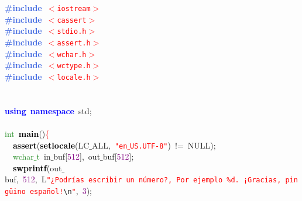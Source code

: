 
{\ttfamily \raggedright {
\noindent
\mbox{}\textbf{\textcolor{RoyalBlue}{\#include}}\ \texttt{\textcolor{Red}{$<$iostream$>$}} \\
\mbox{}\textbf{\textcolor{RoyalBlue}{\#include}}\ \texttt{\textcolor{Red}{$<$cassert$>$}} \\
\mbox{}\textbf{\textcolor{RoyalBlue}{\#include}}\ \texttt{\textcolor{Red}{$<$stdio.h$>$}} \\
\mbox{}\textbf{\textcolor{RoyalBlue}{\#include}}\ \texttt{\textcolor{Red}{$<$assert.h$>$}} \\
\mbox{}\textbf{\textcolor{RoyalBlue}{\#include}}\ \texttt{\textcolor{Red}{$<$wchar.h$>$}} \\
\mbox{}\textbf{\textcolor{RoyalBlue}{\#include}}\ \texttt{\textcolor{Red}{$<$wctype.h$>$}} \\
\mbox{}\textbf{\textcolor{RoyalBlue}{\#include}}\ \texttt{\textcolor{Red}{$<$locale.h$>$}} \\
\mbox{} \\
\mbox{} \\
\mbox{}\textbf{\textcolor{Blue}{using}}\ \textbf{\textcolor{Blue}{namespace}}\ std\textcolor{BrickRed}{;} \\
\mbox{} \\
\mbox{}\textcolor{ForestGreen}{int}\ \textbf{\textcolor{Black}{main}}\textcolor{BrickRed}{()}\textcolor{Red}{\{} \\
\mbox{}\ \ \textbf{\textcolor{Black}{assert}}\textcolor{BrickRed}{(}\textbf{\textcolor{Black}{setlocale}}\textcolor{BrickRed}{(}LC$\_$ALL\textcolor{BrickRed}{,}\ \texttt{\textcolor{Red}{"{}en$\_$US.UTF-8"{}}}\textcolor{BrickRed}{)}\ \textcolor{BrickRed}{!=}\ NULL\textcolor{BrickRed}{);} \\
\mbox{}\ \ \textcolor{ForestGreen}{wchar$\_$t}\ in$\_$buf\textcolor{BrickRed}{[}\textcolor{Purple}{512}\textcolor{BrickRed}{],}\ out$\_$buf\textcolor{BrickRed}{[}\textcolor{Purple}{512}\textcolor{BrickRed}{];} \\
\mbox{}\ \ \textbf{\textcolor{Black}{swprintf}}\textcolor{BrickRed}{(}out$\_$buf\textcolor{BrickRed}{,}\ \textcolor{Purple}{512}\textcolor{BrickRed}{,}\ L\texttt{\textcolor{Red}{"{}¿Podrías\ escribir\ un\ número?,\ Por\ ejemplo\ \%d.\ ¡Gracias,\ pingüino\ español!}}\texttt{\textcolor{CarnationPink}{\textbackslash{}n}}\texttt{\textcolor{Red}{"{}}}\textcolor{BrickRed}{,}\ \textcolor{Purple}{3}\textcolor{BrickRed}{);} \\
}}
